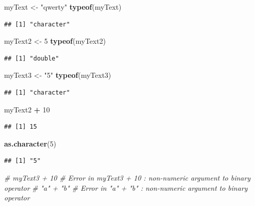 \documentclass[]{book}
\newenvironment{Shaded}{\begin{snugshade}}{\end{snugshade}}
\newcommand{\KeywordTok}[1]{\textcolor[rgb]{0.13,0.29,0.53}{\textbf{#1}}}
\newcommand{\DecValTok}[1]{\textcolor[rgb]{0.00,0.00,0.81}{#1}}
\newcommand{\StringTok}[1]{\textcolor[rgb]{0.31,0.60,0.02}{#1}}
\newcommand{\CommentTok}[1]{\textcolor[rgb]{0.56,0.35,0.01}{\textit{#1}}}
\newcommand{\OperatorTok}[1]{\textcolor[rgb]{0.81,0.36,0.00}{\textbf{#1}}}
\newcommand{\NormalTok}[1]{#1}
\begin{document}
\begin{Shaded}
\begin{Highlighting}[]
\NormalTok{myText <-}\StringTok{ "qwerty"}
\KeywordTok{typeof}\NormalTok{(myText)}
\end{Highlighting}
\end{Shaded}

\begin{verbatim}
## [1] "character"
\end{verbatim}

\begin{Shaded}
\begin{Highlighting}[]
\NormalTok{myText2 <-}\StringTok{ }\DecValTok{5}
\KeywordTok{typeof}\NormalTok{(myText2)}
\end{Highlighting}
\end{Shaded}

\begin{verbatim}
## [1] "double"
\end{verbatim}

\begin{Shaded}
\begin{Highlighting}[]
\NormalTok{myText3 <-}\StringTok{ "5"}
\KeywordTok{typeof}\NormalTok{(myText3)}
\end{Highlighting}
\end{Shaded}

\begin{verbatim}
## [1] "character"
\end{verbatim}

\begin{Shaded}
\begin{Highlighting}[]
\NormalTok{myText2 }\OperatorTok{+}\StringTok{ }\DecValTok{10}
\end{Highlighting}
\end{Shaded}

\begin{verbatim}
## [1] 15
\end{verbatim}

\begin{Shaded}
\begin{Highlighting}[]
\KeywordTok{as.character}\NormalTok{(}\DecValTok{5}\NormalTok{)}
\end{Highlighting}
\end{Shaded}

\begin{verbatim}
## [1] "5"
\end{verbatim}

\begin{Shaded}
\begin{Highlighting}[]
\CommentTok{# myText3 + 10 # Error in myText3 + 10 : non-numeric argument to binary operator}
\CommentTok{# "a" + "b" # Error in "a" + "b" : non-numeric argument to binary operator}
\end{Highlighting}
\end{Shaded}
\end{document}
